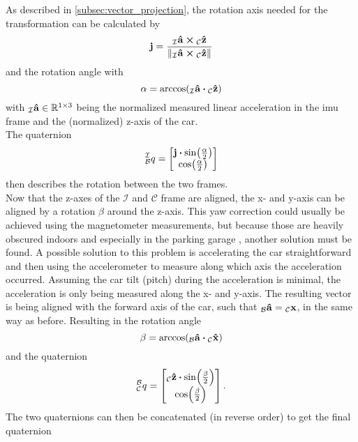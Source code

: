 As described in \cref{subsec:vector_projection}, the rotation axis needed for the transformation can be calculated by
\begin{equation}
	\vb{j} = \frac{\vincs{\vu{a}}{i} \cp \vincs{\vu{z}}{c}}{\norm{\vincs{\vu{a}}{i} \cp \vincs{\vu{z}}{c}}}
\end{equation}
and the rotation angle with
\begin{equation}
	\alpha = \arccos(\vincs{\vu{a}}{i}\vdot \vincs{\vu{z}}{c})
\end{equation}
with $\vincs{\vu{a}}{i} \in \mathbb{R}^{1\times3}$ being the normalized measured linear acceleration in the \gls{imu} frame and  the (normalized) z-axis of the car.\\
The quaternion
\begin{equation}
	\qtf{i}{b} =
	\begin{bmatrix}
		\vb{j}\vdot\sin(\frac{\alpha}{2}) \\
		\cos(\frac{\alpha}{2})
	\end{bmatrix}
\end{equation}
then describes the rotation between the two frames.\\
Now that the z-axes of the $\mathcal{I}$ and $\mathcal{C}$ frame are aligned, the x- and y-axis can be aligned by a rotation $\beta$ around the z-axis.
This yaw correction could usually be achieved using the magnetometer measurements, but because those are heavily obscured indoors and especially in the parking garage \cite{Li2012}, another solution must be found.
A possible solution to this problem is accelerating the car straightforward and then using the accelerometer to measure along which axis the acceleration occurred.
Assuming the car tilt (pitch) during the acceleration is minimal, the acceleration is only being measured along the x- and y-axis.
The resulting vector is being aligned with the forward axis of the car, such that $\vincs{\hat{a}}{b} = \vincs{x}{c}$, in the same way as before.
Resulting in the rotation angle
\begin{equation}
	\beta = \arccos(\vincs{\vu{a}}{b} \vdot \vincs{\hat{x}}{c})
\end{equation}
and the quaternion
\begin{equation}
	\qtf{b}{c} =
	\begin{bmatrix}
		\vincs{\hat{z}}{c}\vdot\sin(\frac{\beta}{2}) \\
		\cos(\frac{\beta}{2})
	\end{bmatrix}.
\end{equation}
The two quaternions can then be concatenated (in reverse order) to get the final quaternion
